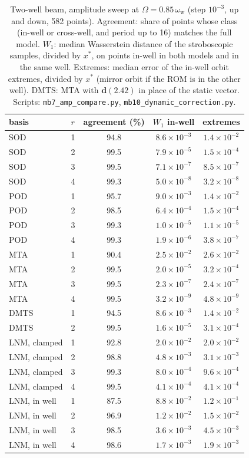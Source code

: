 \documentclass[11pt]{article}
\begin{document}
\begin{table}[tbp]
\centering\small
\caption{Two-well beam, amplitude sweep at $\varOmega=0.85\,\omega_{\mathrm w}$ (step $10^{-3}$, up and down, 582 points). Agreement: share of points whose class (in-well or cross-well, and period up to 16) matches the full model. $W_1$: median Wasserstein distance of the stroboscopic samples, divided by $x^*$, on points in-well in both models and in the same well. Extremes: median error of the in-well orbit extremes, divided by $x^*$ (mirror orbit if the ROM is in the other well). DMTS: MTA with $\bm{d}(2.42)$ in place of the static vector. Scripts: \texttt{mb7\_amp\_compare.py}, \texttt{mb10\_dynamic\_correction.py}.}
\label{tab:s-moon}
\begin{tabular}{llccc}
\toprule
basis & $r$ & agreement (\%) & $W_1$ in-well & extremes\\ \midrule

SOD & 1 & 94.8 & $8.6\times10^{-3}$ & $1.4\times10^{-2}$\\
SOD & 2 & 99.5 & $7.9\times10^{-5}$ & $1.5\times10^{-4}$\\
SOD & 3 & 99.5 & $7.1\times10^{-7}$ & $8.5\times10^{-7}$\\
SOD & 4 & 99.3 & $5.0\times10^{-8}$ & $3.2\times10^{-8}$\\
POD & 1 & 95.7 & $9.0\times10^{-3}$ & $1.4\times10^{-2}$\\
POD & 2 & 98.5 & $6.4\times10^{-4}$ & $1.5\times10^{-4}$\\
POD & 3 & 99.3 & $1.0\times10^{-5}$ & $1.1\times10^{-5}$\\
POD & 4 & 99.3 & $1.9\times10^{-6}$ & $3.8\times10^{-7}$\\
MTA & 1 & 90.4 & $2.5\times10^{-2}$ & $2.6\times10^{-2}$\\
MTA & 2 & 99.5 & $2.0\times10^{-5}$ & $3.2\times10^{-4}$\\
MTA & 3 & 99.5 & $2.3\times10^{-7}$ & $2.4\times10^{-7}$\\
MTA & 4 & 99.5 & $3.2\times10^{-9}$ & $4.8\times10^{-9}$\\
DMTS & 1 & 94.5 & $8.6\times10^{-3}$ & $1.4\times10^{-2}$\\
DMTS & 2 & 99.5 & $1.6\times10^{-5}$ & $3.1\times10^{-4}$\\
LNM, clamped & 1 & 92.8 & $2.0\times10^{-2}$ & $2.0\times10^{-2}$\\
LNM, clamped & 2 & 98.8 & $4.8\times10^{-3}$ & $3.1\times10^{-3}$\\
LNM, clamped & 3 & 99.3 & $8.0\times10^{-4}$ & $9.6\times10^{-4}$\\
LNM, clamped & 4 & 99.5 & $4.1\times10^{-4}$ & $4.1\times10^{-4}$\\
LNM, in well & 1 & 87.5 & $8.8\times10^{-2}$ & $1.2\times10^{-1}$\\
LNM, in well & 2 & 96.9 & $1.2\times10^{-2}$ & $1.5\times10^{-2}$\\
LNM, in well & 3 & 98.5 & $3.6\times10^{-3}$ & $4.5\times10^{-3}$\\
LNM, in well & 4 & 98.6 & $1.7\times10^{-3}$ & $1.9\times10^{-3}$\\
\bottomrule
\end{tabular}
\end{table}
\end{document}
